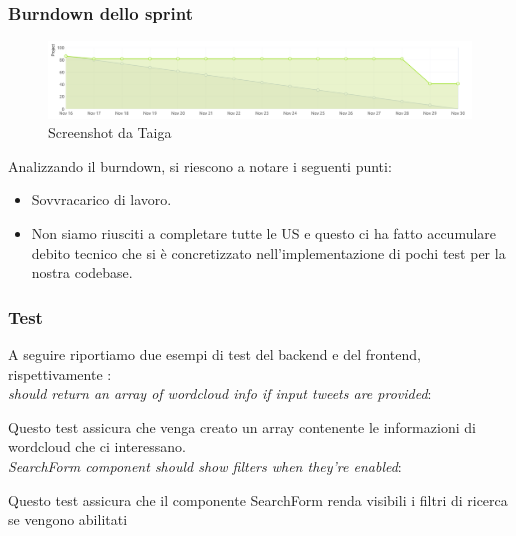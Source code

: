 \documentclass{article}
\begin{document}
\subsubsection{Burndown dello sprint}
\begin{figure}[H]
    \centering
    \includegraphics[scale=0.22]{burdowns/sprint3.png}
    \caption{Screenshot da Taiga}
    \label{fig:burndown3}
\end{figure}
Analizzando il burndown, si riescono a notare i seguenti punti:
\begin{itemize}
    \item Sovvracarico di lavoro.
    \item Non siamo riusciti a completare tutte le US e questo ci ha fatto accumulare debito tecnico che si \`e concretizzato nell'implementazione di pochi test per la nostra codebase.
\end{itemize}
\subsubsection{Test}
A seguire riportiamo due esempi di test del backend e del frontend, rispettivamente : \\
\textit{should return an array of wordcloud info if input tweets are provided}:

Questo test assicura che venga creato un array contenente le informazioni di wordcloud che ci interessano. \\
\textit{SearchForm component should show filters when they're enabled}:

Questo test assicura che il componente SearchForm renda visibili i filtri di ricerca se vengono abilitati
\end{document}
